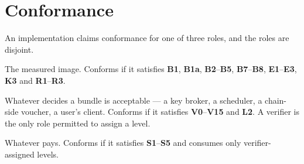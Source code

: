 \documentclass[11pt,a4paper]{article}
\newcommand{\req}[1]{\textbf{#1}}
\begin{document}
\section{Conformance}
\label{sec:conformance}

An implementation claims conformance for one of three roles, and the roles are
disjoint.

\begin{description}[leftmargin=1.4em]
\item[Environment.] The measured image. Conforms if it satisfies \req{B1},
\req{B1a}, \req{B2}--\req{B5}, \req{B7}--\req{B8}, \req{E1}--\req{E3}, \req{K3} and
\req{R1}--\req{R3}.
\item[Verifier.] Whatever decides a bundle is acceptable --- a key broker, a
scheduler, a chain-side voucher, a user's client. Conforms if it satisfies
\req{V0}--\req{V15} and \req{L2}. A verifier is the only role permitted to assign a
level.
\item[Settlement.] Whatever pays. Conforms if it satisfies \req{S1}--\req{S5} and
consumes only verifier-assigned levels.
\end{description}
\end{document}
